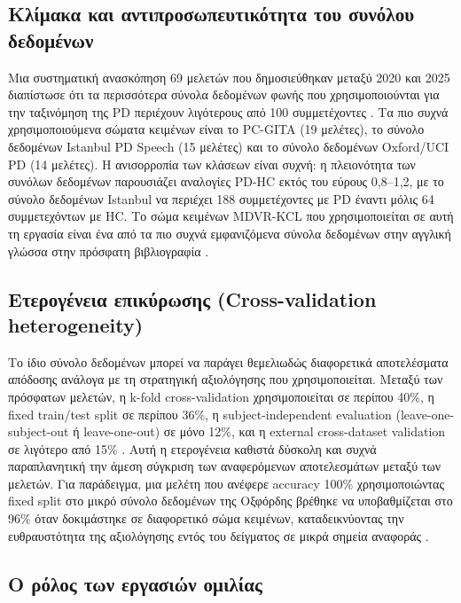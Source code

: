 \subsection{Κλίμακα και αντιπροσωπευτικότητα του συνόλου δεδομένων}
\label{sec:dataset-scale}

Μια συστηματική ανασκόπηση 69 μελετών που δημοσιεύθηκαν μεταξύ 2020 και 2025 διαπίστωσε ότι τα περισσότερα σύνολα δεδομένων φωνής που χρησιμοποιούνται για την ταξινόμηση της PD περιέχουν λιγότερους από 100 συμμετέχοντες \citep{sedigh_malekroodi2025voice}. Τα πιο συχνά χρησιμοποιούμενα σώματα κειμένων είναι το PC-GITA (19 μελέτες), το σύνολο δεδομένων Istanbul PD Speech (15 μελέτες) και το σύνολο δεδομένων Oxford/UCI PD (14 μελέτες). Η ανισορροπία των κλάσεων είναι συχνή: η πλειονότητα των συνόλων δεδομένων παρουσιάζει αναλογίες PD-HC εκτός του εύρους 0,8--1,2, με το σύνολο δεδομένων Istanbul να περιέχει 188 συμμετέχοντες με PD έναντι μόλις 64 συμμετεχόντων με HC. Το σώμα κειμένων MDVR-KCL που χρησιμοποιείται σε αυτή τη εργασία είναι ένα από τα πιο συχνά εμφανιζόμενα σύνολα δεδομένων στην αγγλική γλώσσα στην πρόσφατη βιβλιογραφία \citep{sedigh_malekroodi2025voice}.

\subsection{Ετερογένεια επικύρωσης (Cross-validation heterogeneity)}
\label{sec:validation-heterogeneity}

Το ίδιο σύνολο δεδομένων μπορεί να παράγει θεμελιωδώς διαφορετικά αποτελέσματα απόδοσης ανάλογα με τη στρατηγική αξιολόγησης που χρησιμοποιείται. Μεταξύ των πρόσφατων μελετών, η k-fold cross-validation χρησιμοποιείται σε περίπου 40\%, η fixed train/test split σε περίπου 36\%, η subject-independent evaluation (leave-one-subject-out ή leave-one-out) σε μόνο 12\%, και η external cross-dataset validation σε λιγότερο από 15\% \citep{sedigh_malekroodi2025voice}. Αυτή η ετερογένεια καθιστά δύσκολη και συχνά παραπλανητική την άμεση σύγκριση των αναφερόμενων αποτελεσμάτων μεταξύ των μελετών. Για παράδειγμα, μια μελέτη που ανέφερε accuracy 100\% χρησιμοποιώντας fixed split στο μικρό σύνολο δεδομένων της Οξφόρδης βρέθηκε να υποβαθμίζεται στο 96\% όταν δοκιμάστηκε σε διαφορετικό σώμα κειμένων, καταδεικνύοντας την ευθραυστότητα της αξιολόγησης εντός του δείγματος σε μικρά σημεία αναφοράς \citep{sedigh_malekroodi2025voice}.

\subsection{Ο ρόλος των εργασιών ομιλίας}
\label{sec:speech-task-design}

